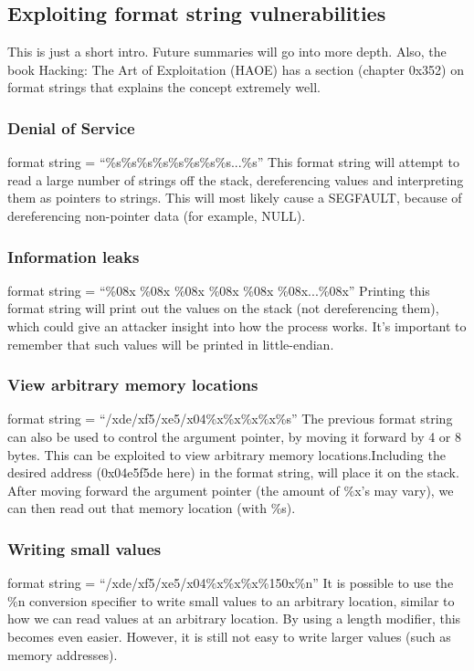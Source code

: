 \documentclass[letterpaper]{article}
\begin{document}
\subsection{Exploiting format string vulnerabilities}
This is just a short intro. Future summaries will go into more depth. Also, the book Hacking: The Art of Exploitation (HAOE) has a section (chapter 0x352) on format strings that explains the concept extremely well.

\subsubsection{Denial of Service}
format string  = ``\%s\%s\%s\%s\%s\%s\%s\%s...\%s''\newline
This format string will attempt to read a large number of strings off the stack, dereferencing values and interpreting them as pointers to strings. This will most likely cause a SEGFAULT, because of dereferencing non-pointer data (for example, NULL).

\subsubsection{Information leaks}
format string  = ``\%08x \%08x \%08x \%08x \%08x \%08x...\%08x''\newline
Printing this format string will print out the values on the stack (not dereferencing them), which could give an attacker insight into how the process works. It's important to remember that such values will be printed in little-endian.

\subsubsection{View arbitrary memory locations}
format string  = ``\slash xde\slash xf5\slash xe5\slash x04\%x\%x\%x\%x\%s''\newline
The previous format string can also be used to control the argument pointer, by moving it forward by 4 or 8 bytes. This can be exploited to view arbitrary memory locations.\newline Including the desired address (0x04e5f5de here) in the format string, will place it on the stack. After moving forward the argument pointer (the amount of \%x's may vary), we can then read out that memory location (with \%s).

\subsubsection{Writing small values}
format string  = ``\slash xde\slash xf5\slash xe5\slash x04\%x\%x\%x\%150x\%n''\newline
It is possible to use the \%n conversion specifier to write small values to an arbitrary location, similar to how we can read values at an arbitrary location. By using a length modifier, this becomes even easier. However, it is still not easy to write larger values (such as memory addresses).
\end{document}
